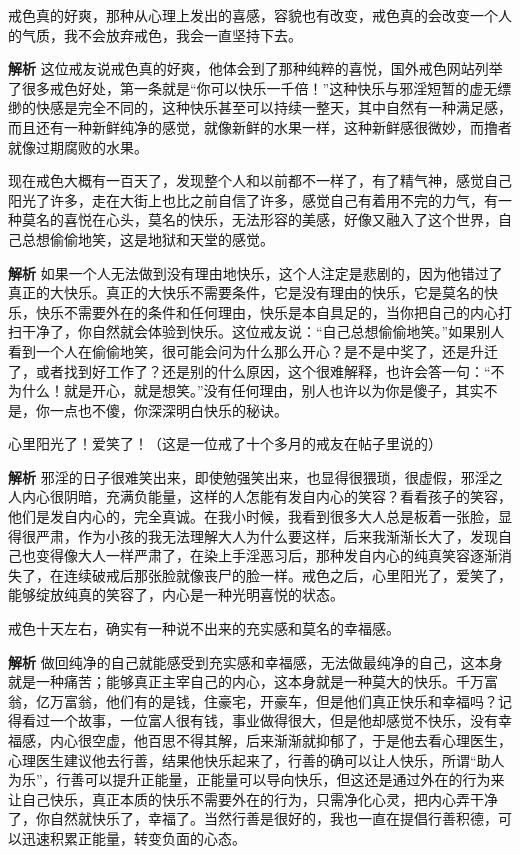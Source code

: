 \begin{case}[你可以快乐 1000 倍！]
    戒色真的好爽，那种从心理上发出的喜感，容貌也有改变，戒色真的会改变一个人的气质，我不会放弃戒色，我会一直坚持下去。

    \textbf{解析} 这位戒友说戒色真的好爽，他体会到了那种纯粹的喜悦，国外戒色网站列举了很多戒色好处，第一条就是“你可以快乐一千倍！”这种快乐与邪淫短暂的虚无缥缈的快感是完全不同的，这种快乐甚至可以持续一整天，其中自然有一种满足感，而且还有一种新鲜纯净的感觉，就像新鲜的水果一样，这种新鲜感很微妙，而撸者就像过期腐败的水果。
\end{case}

\begin{case}[没有理由地快乐]
    现在戒色大概有一百天了，发现整个人和以前都不一样了，有了精气神，感觉自己阳光了许多，走在大街上也比之前自信了许多，感觉自己有着用不完的力气，有一种莫名的喜悦在心头，莫名的快乐，无法形容的美感，好像又融入了这个世界，自己总想偷偷地笑，这是地狱和天堂的感觉。

    \textbf{解析} 如果一个人无法做到没有理由地快乐，这个人注定是悲剧的，因为他错过了真正的大快乐。真正的大快乐不需要条件，它是没有理由的快乐，它是莫名的快乐，快乐不需要外在的条件和任何理由，快乐是本自具足的，当你把自己的内心打扫干净了，你自然就会体验到快乐。这位戒友说：“自己总想偷偷地笑。”如果别人看到一个人在偷偷地笑，很可能会问为什么那么开心？是不是中奖了，还是升迁了，或者找到好工作了？还是别的什么原因，这个很难解释，也许会答一句：“不为什么！就是开心，就是想笑。”没有任何理由，别人也许以为你是傻子，其实不是，你一点也不傻，你深深明白快乐的秘诀。
\end{case}

\begin{case}[戒色之后爱笑了]
    心里阳光了！爱笑了！（这是一位戒了十个多月的戒友在帖子里说的）

    \textbf{解析} 邪淫的日子很难笑出来，即使勉强笑出来，也显得很猥琐，很虚假，邪淫之人内心很阴暗，充满负能量，这样的人怎能有发自内心的笑容？看看孩子的笑容，他们是发自内心的，完全真诚。在我小时候，我看到很多大人总是板着一张脸，显得很严肃，作为小孩的我无法理解大人为什么要这样，后来我渐渐长大了，发现自己也变得像大人一样严肃了，在染上手淫恶习后，那种发自内心的纯真笑容逐渐消失了，在连续破戒后那张脸就像丧尸的脸一样。戒色之后，心里阳光了，爱笑了，能够绽放纯真的笑容了，内心是一种光明喜悦的状态。
\end{case}

\begin{case}[充实感和幸福感]
    戒色十天左右，确实有一种说不出来的充实感和莫名的幸福感。

    \textbf{解析} 做回纯净的自己就能感受到充实感和幸福感，无法做最纯净的自己，这本身就是一种痛苦；能够真正主宰自己的内心，这本身就是一种莫大的快乐。千万富翁，亿万富翁，他们有的是钱，住豪宅，开豪车，但是他们真正快乐和幸福吗？记得看过一个故事，一位富人很有钱，事业做得很大，但是他却感觉不快乐，没有幸福感，内心很空虚，他百思不得其解，后来渐渐就抑郁了，于是他去看心理医生，心理医生建议他去行善，结果他快乐起来了，行善的确可以让人快乐，所谓“助人为乐”，行善可以提升正能量，正能量可以导向快乐，但这还是通过外在的行为来让自己快乐，真正本质的快乐不需要外在的行为，只需净化心灵，把内心弄干净了，你自然就快乐了，幸福了。当然行善是很好的，我也一直在提倡行善积德，可以迅速积累正能量，转变负面的心态。
\end{case}

